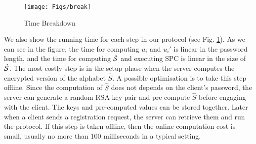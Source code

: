 \begin{figure}[!bp]
\centering
\texttt{[image: Figs/break]}
\caption{Time Breakdown}\label{fig::break}%
\end{figure}

We also show the running time for each step in our protocol (see Fig. \ref{fig::break}). As we can see in the figure, the time for computing $u_i$ and $u_i'$ is linear in the password length, and the time for computing $\hat{\mathcal{S}}$ and executing SPC is linear in the size of $\hat{\mathcal{S}}$. The most costly step is in the setup phase when the server computes the encrypted version of the alphabet $\hat{S}$. A possible optimisation is to take this step offline. 
Since the computation of $\hat{S}$ does not depends on the client's password, the server can generate a random RSA key pair and pre-compute $\hat{S}$ before engaging with the client. 
The keys and pre-computed values can be stored together. Later when a client sends a registration request, the server can retrieve them and run the protocol. If this step is taken offline, then the online computation cost is small, usually no more than 100 milliseconds in a typical setting. 
